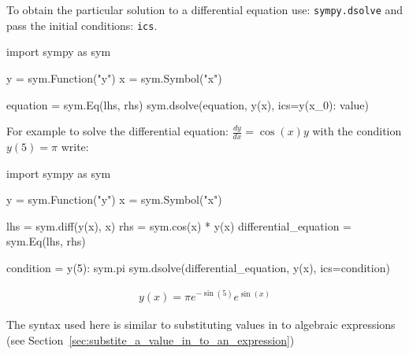 To obtain the particular solution to a differential equation use:
\texttt{sympy.dsolve} and pass the initial conditions: \texttt{ics}.


\begin{api}
import sympy as sym

y = sym.Function("y")
x = sym.Symbol("x")

equation = sym.Eq(lhs, rhs)
sym.dsolve(equation, y(x), ics={y(x_0): value})
\end{api}



For example to solve the differential equation: \(\frac{dy}{dx} = \cos(x) y\)
with the condition \(y(5)= \pi\) 
write:




\begin{pyin}
import sympy as sym

y = sym.Function("y")
x = sym.Symbol("x")

lhs = sym.diff(y(x), x)
rhs = sym.cos(x) * y(x)
differential_equation = sym.Eq(lhs, rhs)

condition = {y(5): sym.pi}
sym.dsolve(differential_equation, y(x), ics=condition)
\end{pyin}




\begin{equation*}
\begin{split}\displaystyle y{\left(x \right)} = \pi e^{- \sin{\left(5 \right)}} e^{\sin{\left(x \right)}}\end{split}
\end{equation*}



\begin{note}
The syntax used here is similar to substituting values in to algebraic
expressions (see Section~\ref{sec:substite_a_value_in_to_an_expression})
\end{note}






